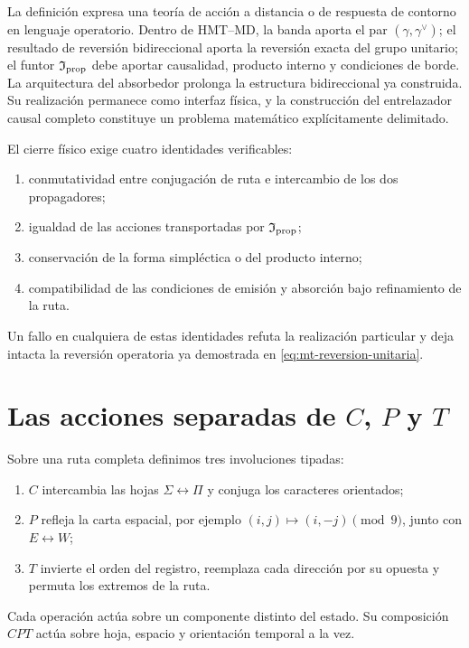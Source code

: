 La definición expresa una teoría de acción a distancia o de respuesta de
contorno en lenguaje operatorio. Dentro de HMT--MD, la banda aporta el par
$(\gamma,\gamma^\vee)$; el resultado de reversión bidireccional aporta
la reversión exacta del grupo unitario; el funtor
$\mathfrak I_{\rm prop}$ debe aportar causalidad, producto interno y
condiciones de borde. La arquitectura del absorbedor prolonga la estructura
bidireccional ya construida. Su realización permanece como interfaz física,
y la construcción del entrelazador causal completo constituye un problema
matemático explícitamente delimitado.

El cierre físico exige cuatro identidades verificables:
\begin{enumerate}
 \item conmutatividad entre conjugación de ruta e intercambio de los dos
 propagadores;
 \item igualdad de las acciones transportadas por
 $\mathfrak I_{\rm prop}$;
 \item conservación de la forma simpléctica o del producto interno;
 \item compatibilidad de las condiciones de emisión y absorción bajo
 refinamiento de la ruta.
\end{enumerate}
Un fallo en cualquiera de estas identidades refuta la realización particular
y deja intacta la reversión operatoria ya demostrada en
\eqref{eq:mt-reversion-unitaria}.

\section{Las acciones separadas de \texorpdfstring{$C$}{C},
\texorpdfstring{$P$}{P} y \texorpdfstring{$T$}{T}}

Sobre una ruta completa definimos tres involuciones tipadas:
\begin{enumerate}
 \item $C$ intercambia las hojas $\Sigma\leftrightarrow\Pi$ y conjuga los
 caracteres orientados;
 \item $P$ refleja la carta espacial, por ejemplo
 $(i,j)\mapsto(i,-j)\pmod9$, junto con
 $E\leftrightarrow W$;
 \item $T$ invierte el orden del registro, reemplaza cada dirección por su
 opuesta y permuta los extremos de la ruta.
\end{enumerate}
Cada operación actúa sobre un componente distinto del estado. Su composición
$CPT$ actúa sobre hoja, espacio y orientación temporal a la vez.

